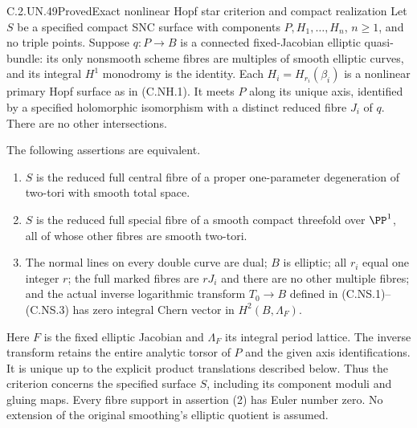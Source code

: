 \begin{statement}{C.2.UN.49}{Proved}{Exact nonlinear Hopf star criterion and compact realization}
Let $S$ be a specified compact SNC surface with components
$P,H_1,\ldots,H_n$, $n\ge1$, and no triple points. Suppose
$q:P\to B$ is a connected fixed-Jacobian elliptic quasi-bundle:
its only nonsmooth scheme fibres are multiples of smooth
elliptic curves, and its integral $H^1$ monodromy is the
identity. Each $H_i=H_{r_i}(\beta_i)$ is a nonlinear primary
Hopf surface as in (C.NH.1). It meets $P$ along its unique
axis, identified by a specified holomorphic isomorphism
with a distinct reduced fibre $J_i$ of $q$. There are no
other intersections.

The following assertions are equivalent.

\begin{enumerate}
\item $S$ is the reduced full central fibre of a proper
one-parameter degeneration of two-tori with smooth total space.
\item $S$ is the reduced full special fibre of a smooth compact
threefold over $\PP^1$, all of whose other fibres are smooth
two-tori.
\item The normal lines on every double curve are dual;
$B$ is elliptic; all $r_i$ equal one integer $r$; the full
marked fibres are $rJ_i$ and there are no other multiple
fibres; and the actual inverse logarithmic transform
$T_0\to B$ defined in (C.NS.1)--(C.NS.3) has zero integral
Chern vector in $H^2(B,\Lambda_F)$.
\end{enumerate}

Here $F$ is the fixed elliptic Jacobian and $\Lambda_F$ its
integral period lattice. The inverse transform retains
the entire analytic torsor of $P$ and the given axis
identifications. It is unique up to the explicit product
translations described below. Thus the criterion concerns
the specified surface $S$, including its component
moduli and gluing maps. Every fibre support in assertion
(2) has Euler number zero. No extension of the original
smoothing's elliptic quotient is assumed.
\end{statement}

